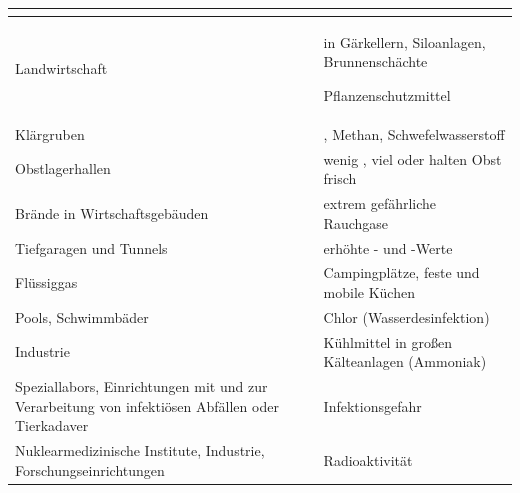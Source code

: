 


\noindent\begin{tabulary}{\linewidth}{LL}\toprule
{}
\\\midrule
Landwirtschaft
 &
 in Gärkellern, Siloanlagen, Brunnenschächte

Pflanzenschutzmittel
\\\addlinespace
Klärgruben
 &
, Methan, Schwefelwasserstoff
\\\addlinespace
Obstlagerhallen
 &
wenig , viel  oder  halten Obst frisch
\\\addlinespace
Brände in Wirtschaftsgebäuden
 &
extrem gefährliche Rauchgase
\\\addlinespace
Tiefgaragen und Tunnels
 &
erhöhte - und -Werte
\\\addlinespace
Flüssiggas
 &
Campingplätze, feste und mobile Küchen
\\\addlinespace
Pools, Schwimmbäder
 &
Chlor (Wasserdesinfektion)
\\\addlinespace
Industrie
 &
Kühlmittel in großen Kälteanlagen (Ammoniak)
\\\addlinespace
Speziallabors, Einrichtungen mit und zur Verarbeitung von infektiösen
Abfällen oder Tierkadaver
 &
Infektionsgefahr
\\\addlinespace
Nuklearmedizinische Institute, Industrie, Forschungseinrichtungen
 &
Radioaktivität
\\\bottomrule
\end{tabulary}






















